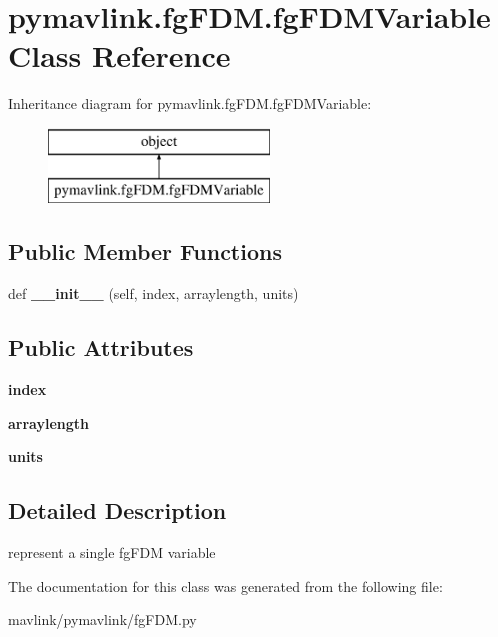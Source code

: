 \hypertarget{classpymavlink_1_1fgFDM_1_1fgFDMVariable}{}\section{pymavlink.\+fg\+F\+D\+M.\+fg\+F\+D\+M\+Variable Class Reference}
\label{classpymavlink_1_1fgFDM_1_1fgFDMVariable}
Inheritance diagram for pymavlink.\+fg\+F\+D\+M.\+fg\+F\+D\+M\+Variable\+:\begin{figure}[H]
\begin{center}
\leavevmode
\includegraphics[height=2.000000cm]{classpymavlink_1_1fgFDM_1_1fgFDMVariable}
\end{center}
\end{figure}
\subsection*{Public Member Functions}
\begin{DoxyCompactItemize}
\item 
\mbox{\label{classpymavlink_1_1fgFDM_1_1fgFDMVariable_a78133d155a96ae5e4179b2303b4fac54}} 
def {\bfseries \+\_\+\+\_\+init\+\_\+\+\_\+} (self, index, arraylength, units)
\end{DoxyCompactItemize}
\subsection*{Public Attributes}
\begin{DoxyCompactItemize}
\item 
\mbox{\label{classpymavlink_1_1fgFDM_1_1fgFDMVariable_a700fa75ac67b10effc7ff492ec16972e}} 
{\bfseries index}
\item 
\mbox{\label{classpymavlink_1_1fgFDM_1_1fgFDMVariable_a2b1ccbcc1383da3cbb74593594acd483}} 
{\bfseries arraylength}
\item 
\mbox{\label{classpymavlink_1_1fgFDM_1_1fgFDMVariable_a7c4d651947e6e5c81957da2c277d080f}} 
{\bfseries units}
\end{DoxyCompactItemize}


\subsection{Detailed Description}
\begin{DoxyVerb}represent a single fgFDM variable\end{DoxyVerb}
 

The documentation for this class was generated from the following file\+:\begin{DoxyCompactItemize}
\item 
mavlink/pymavlink/fg\+F\+D\+M.\+py\end{DoxyCompactItemize}
